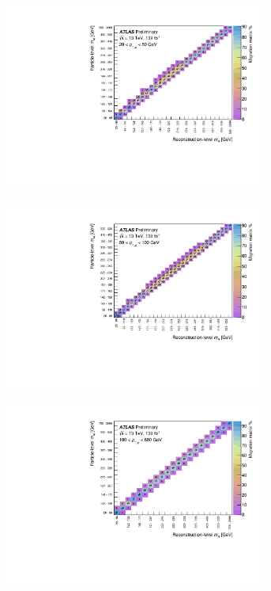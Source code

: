 \begin{figure}[htb]
  \begin{subfigure}{.49\textwidth}\centering\includegraphics[width = 0.95\textwidth]{Figures/m4l/UnfoldingStudies/v014_matrices/m4l_pt4l20-50Matrix.pdf}\end{subfigure}
  \begin{subfigure}{.49\textwidth}\centering\includegraphics[width = 0.95\textwidth]{Figures/m4l/UnfoldingStudies/v014_matrices/m4l_pt4l50-100Matrix.pdf}\end{subfigure}
  \begin{subfigure}{.49\textwidth}\centering\includegraphics[width = 0.95\textwidth]{Figures/m4l/UnfoldingStudies/v014_matrices/m4l_pt4l100-600Matrix.pdf}\end{subfigure}

\end{figure}

